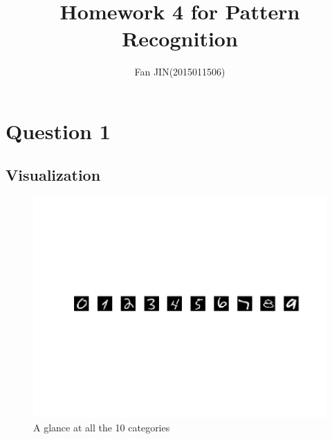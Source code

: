 \documentclass{article}
\begin{document}
\title{\textsf{Homework 4 for Pattern Recognition}}
\author{Fan JIN\quad (2015011506)}
\maketitle

\section*{Question 1}
{
    \subsection*{Visualization}
    {
        \begin{figure}[H]
            \centering
            \includegraphics[width = 1.0\linewidth]{src1/glance.png}
            \caption{A glance at all the 10 categories}
        \end{figure}
    }

}
\end{document}
